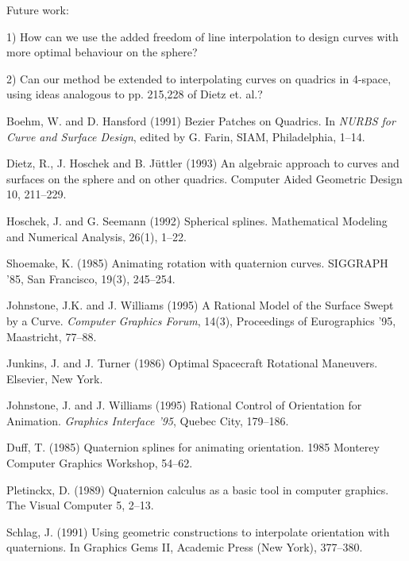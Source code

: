 
Future work:

1) How can we use the added freedom of line interpolation to design
	curves with more optimal behaviour on the sphere?

2) Can our method be extended to interpolating curves on quadrics in 4-space, using
ideas analogous to pp. 215,228 of Dietz et. al.?

Boehm, W. and D. Hansford (1991)
Bezier Patches on Quadrics.
In {\em NURBS for Curve and Surface Design}, edited by G. Farin,
SIAM, Philadelphia, 1--14.

Dietz, R., J. Hoschek and B. J\"{u}ttler (1993)
An algebraic approach to curves and surfaces on the sphere and on other
quadrics.  Computer Aided Geometric Design 10, 211--229.

Hoschek, J. and G. Seemann (1992)
Spherical splines.
Mathematical Modeling and Numerical Analysis, 26(1), 1--22.

Shoemake, K. (1985) Animating rotation with quaternion curves.
SIGGRAPH '85, San Francisco, 19(3), 245--254.

Johnstone, J.K. and J. Williams (1995)
A Rational Model of the Surface Swept by a Curve.
{\em Computer Graphics Forum}, 14(3), Proceedings of Eurographics '95,
Maastricht, 77--88.

Junkins, J. and J. Turner (1986)
Optimal Spacecraft Rotational Maneuvers.
Elsevier, New York.

Johnstone, J. and J. Williams (1995)
Rational Control of Orientation for Animation.
{\em Graphics Interface '95}, Quebec City, 179--186.

Duff, T. (1985)
Quaternion splines for animating orientation.
1985 Monterey Computer Graphics Workshop, 54--62.

Pletinckx, D. (1989) 
Quaternion calculus as a basic tool in computer graphics.
The Visual Computer 5, 2--13.

Schlag, J. (1991) Using geometric constructions to interpolate
orientation with quaternions.  In Graphics Gems II, Academic Press (New York),
377--380.

